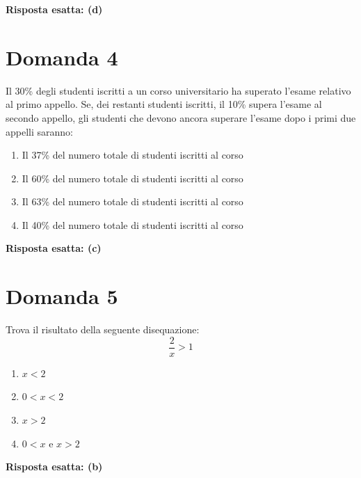 \documentclass{article}
\begin{document}
\textbf{Risposta esatta: (d)}

\medskip

\section*{Domanda 4}

Il 30\% degli studenti iscritti a un corso universitario
ha superato l'esame relativo al primo appello.
Se, dei restanti studenti iscritti,
il 10\% supera l'esame al secondo appello,
gli studenti che devono ancora superare l'esame
dopo i primi due appelli saranno:

\begin{enumerate}
    \item[a)] Il 37\% del numero totale di studenti iscritti al corso
    \item[b)] Il 60\% del numero totale di studenti iscritti al corso
    \item[c)] Il 63\% del numero totale di studenti iscritti al corso
    \item[d)] Il 40\% del numero totale di studenti iscritti al corso
\end{enumerate}

\textbf{Risposta esatta: (c)}

\medskip

\section*{Domanda 5}

Trova il risultato della seguente disequazione:
\[
    \frac{2}{x} > 1
\]

\begin{enumerate}
    \item[a)] $x < 2$
    \item[b)] $0 < x < 2$
    \item[c)] $x > 2$
    \item[d)] $0 < x$ e $x > 2$
\end{enumerate}

\textbf{Risposta esatta: (b)}
\end{document}

